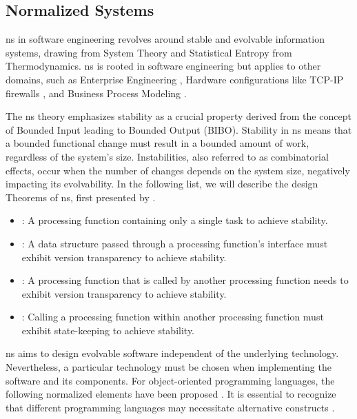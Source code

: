 \subsection{Normalized Systems} \label{subsec:ns}

\gls{ns} in software engineering revolves around stable and evolvable information systems,
drawing from System Theory and Statistical Entropy from Thermodynamics. \gls{ns} is rooted
in software engineering but applies to other domains, such as Enterprise Engineering
\cite{huysmans_towards_2013}, Hardware configurations like TCP-IP firewalls
\cite{haerens_evolvability_2021}, and Business Process Modeling
\cite{van_nuffel_towards_2011}.

The \gls{ns} theory emphasizes stability as a crucial property derived from the concept of
Bounded Input leading to Bounded Output (BIBO). Stability in \gls{ns} means that a bounded
functional change must result in a bounded amount of work, regardless of the system's
size. Instabilities, also referred to as combinatorial effects, occur when the number of
changes depends on the system size, negatively impacting its evolvability. 
\newline 
In the following list, we will describe the design Theorems of \gls{ns}, first presented
by \textcite{mannaert_normalized_2009}. 
\begin{itemize}
    \item {}: A processing function containing only a single task to achieve
    stability.
    \item {}: A data structure passed through a processing function's interface
    must exhibit version transparency to achieve stability. 
    \item {}: A processing function that is called by another processing
    function needs to exhibit version transparency to achieve stability.
    \item {}: Calling a processing function within another processing function
    must exhibit state-keeping to achieve stability.
\end{itemize}

\gls{ns} aims to design evolvable software independent of the underlying technology.
Nevertheless, a particular technology must be chosen when implementing the software and
its components. For object-oriented programming languages, the following normalized
elements have been proposed \parencite[363-398]{mannaert_normalized_2016}. It is essential
to recognize that different programming languages may necessitate alternative constructs
\parencite[364]{mannaert_normalized_2016}. 

